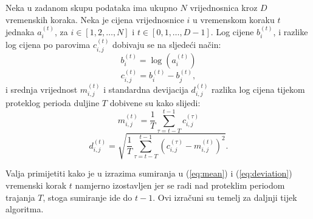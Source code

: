 \documentclass[lmodern, utf8, diplomski, numeric]{fer}
\begin{document}
  Neka u zadanom skupu podataka ima ukupno $N$ vrijednosnica kroz $D$ vremenskih koraka.
  Neka je cijena vrijednosnice $i$ u vremenskom koraku $t$ jednaka $a_i^{(t)}$, za $i \in {\left[1, 2, \ldots, N\right]}$ i $t \in {\left[0, 1, \ldots, D-1\right]}$.
  Log cijene $b_i^{(t)}$, i razlike log cijena po parovima $c_{i,j}^{(t)}$ dobivaju se na sljedeći način:
  \begin{equation} b_i^{(t)} = \log\left(a_i^{(t)}\right) \end{equation}
  \begin{equation} c_{i,j}^{(t)} = b_i^{(t)} - b_j^{(t)}, \end{equation}
  i srednja vrijednost $m_{i,j}^{(t)}$ i standardna devijacija $d_{i,j}^{(t)}$ razlika log cijena tijekom proteklog perioda duljine $T$ dobivene su kako slijedi:
  \begin{equation}
  \label{eq:mean}
  m_{i,j}^{(t)} = \frac{1}{T}\sum_{\tau = t - T}^{t - 1} c_{i,j}^{(\tau)}
  \end{equation}
  \begin{equation}
  \label{eq:deviation}
  d_{i,j}^{(t)} = \sqrt{\frac{1}{T}\sum_{\tau=t - T}^{t - 1} \left(c_{i,j}^{(\tau)} - m_{i,j}^{(t)} \right)^2}.
  \end{equation}
  
  Valja primijetiti kako je u izrazima sumiranja u (\ref{eq:mean}) i (\ref{eq:deviation}) vremenski korak $t$ namjerno izostavljen jer se radi nad proteklim periodom trajanja $T$, stoga sumiranje ide do $t - 1$.
  Ovi izračuni su temelj za daljnji tijek algoritma.
\end{document}
